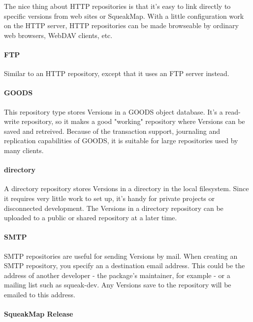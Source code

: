 \documentclass[a4paper,10pt,twoside]{book}
\begin{document}
The nice thing about HTTP repositories is that it's easy to link directly to specific versions from web sites or SqueakMap. With a little configuration work on the HTTP server, HTTP repositories can be made browseable by ordinary web browsers, WebDAV clients, etc.

\paragraph{FTP}

Similar to an HTTP repository, except that it uses an FTP server instead.

\paragraph{GOODS}

This repository type stores Versions in a GOODS object database. It's a read-write repository, so it makes a good "working" repository where Versions can be saved and retreived. Because of the transaction support, journaling and replication capabilities of GOODS, it is suitable for large repositories used by many clients.

\paragraph{directory}

A directory repository stores Versions in a directory in the local filesystem. Since it requires very little work to set up, it's handy for private projects or disconnected development. The Versions in a directory repository can be uploaded to a public or shared repository at a later time.

\paragraph{SMTP}

SMTP repositories are useful for sending Versions by mail. When creating an SMTP repository, you specify an a destination email address. This could be the address of another developer - the package's maintainer, for example - or a mailing list such as squeak-dev. Any Versions save to the repository will be emailed to this address.

\paragraph{SqueakMap Release}
\end{document}
